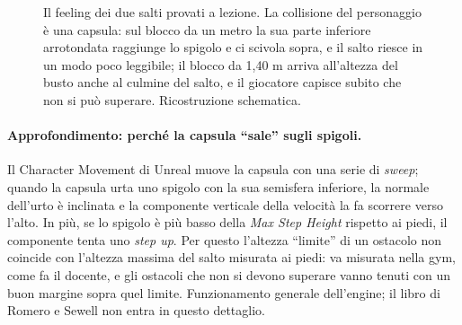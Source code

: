 \begin{figure}[htbp]
\centering
{}
\caption{Il feeling dei due salti provati a lezione. La collisione del personaggio è una
capsula: sul blocco da un metro la sua parte inferiore arrotondata raggiunge lo spigolo e
ci scivola sopra, e il salto riesce in un modo poco leggibile; il blocco da 1,40 m arriva
all'altezza del busto anche al culmine del salto, e il giocatore capisce subito che non
si può superare. Ricostruzione schematica.}
\label{ue13:fig:capsula}
\end{figure}

\paragraph{Approfondimento: perché la capsula ``sale'' sugli spigoli.} Il Character
Movement di Unreal muove la capsula con una serie di \emph{sweep}; quando la capsula urta
uno spigolo con la sua semisfera inferiore, la normale dell'urto è inclinata e la
componente verticale della velocità la fa scorrere verso l'alto. In più, se lo spigolo è
più basso della \emph{Max Step Height} rispetto ai piedi, il componente tenta uno
\emph{step up}. Per questo l'altezza ``limite'' di un ostacolo non coincide con l'altezza
massima del salto misurata ai piedi: va misurata nella gym, come fa il docente, e gli
ostacoli che non si devono superare vanno tenuti con un buon margine sopra quel limite.
Funzionamento generale dell'engine; il libro di Romero e Sewell non entra in questo
dettaglio.

